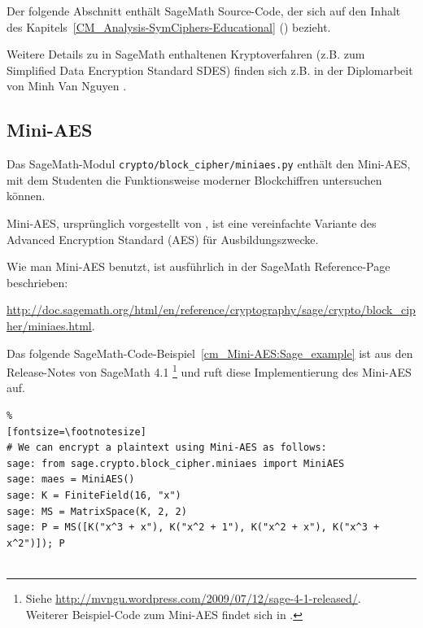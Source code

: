 \begin{refsegment}
Der folgende Abschnitt enthält SageMath Source-Code, der sich auf den
Inhalt des Kapitels~\ref{CM_Analysis-SymCiphers-Educational}
(\glqq {}\grqq) bezieht.

Weitere Details zu in SageMath enthaltenen Kryptoverfahren (z.B. zum Simplified
Data Encryption Standard SDES) finden sich z.B. in der Diplomarbeit von Minh Van
Nguyen \cite{Nguyen2009b}.

\subsection{Mini-AES}
\label{CM_Sage_Mini-AES}

Das SageMath-Modul \texttt{crypto/block\_cipher/miniaes.py} enthält den Mini-AES, mit
dem Studenten die Funktionsweise moderner Blockchiffren untersuchen können.

Mini-AES, ursprünglich vorgestellt von \cite{Phan2002}, ist eine vereinfachte
Variante des Advanced Encryption Standard (AES) für Ausbildungszwecke.

Wie man Mini-AES benutzt, ist ausführlich in der SageMath Reference-Page beschrieben:
\begin{sloppypar} %
  \url{http://doc.sagemath.org/html/en/reference/cryptography/sage/crypto/block_cipher/miniaes.html}.
\end{sloppypar}

Das folgende SageMath-Code-Beispiel~\ref{cm_Mini-AES:Sage_example}
ist aus den Release-Notes von SageMath 4.1%
\footnote{
  Siehe \url{http://mvngu.wordpress.com/2009/07/12/sage-4-1-released/}.\\
  Weiterer Beispiel-Code zum Mini-AES findet sich in
  \cite[Kap. 6.5 und Anhang D]{Nguyen2009a}.
}
und ruft diese Implementierung des Mini-AES auf.


\begin{sagecode}
\begin{Verbatim}%
[fontsize=\footnotesize]
# We can encrypt a plaintext using Mini-AES as follows:
sage: from sage.crypto.block_cipher.miniaes import MiniAES
sage: maes = MiniAES()
sage: K = FiniteField(16, "x")
sage: MS = MatrixSpace(K, 2, 2)
sage: P = MS([K("x^3 + x"), K("x^2 + 1"), K("x^2 + x"), K("x^3 + x^2")]); P


\end{Verbatim}
\end{sagecode}
\end{refsegment}
